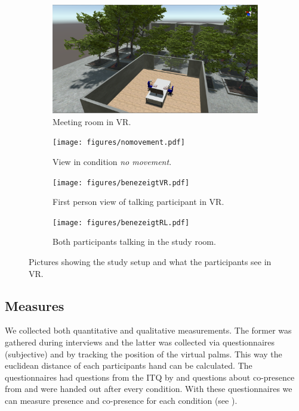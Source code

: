 \documentclass[english,runningheads,a4paper]{llncs}[2018/03/10]
\begin{document}
\begin{figure}[t]
    \centering
    \begin{subfigure}[b]{0.49\textwidth}
        \centering
        \includegraphics[width=\textwidth]{figures/far.pdf}
        \caption{Meeting room in VR.}
        \label{fig:meetingroom}
    \end{subfigure} \hfill
    \begin{subfigure}[b]{0.49\textwidth}
        \centering
        \texttt{[image: figures/nomovement.pdf]}
        \caption{View in condition \textit{no movement}.}
        \label{fig:meetingroom2}
    \end{subfigure} \hfill
    \begin{subfigure}[b]{0.49\textwidth}
        \centering
        \texttt{[image: figures/benezeigtVR.pdf]}
        \caption{First person view of talking participant in VR.}
        \label{fig:pointRL}
    \end{subfigure} \hfill
    \begin{subfigure}[b]{0.49\textwidth}
        \centering
        \texttt{[image: figures/benezeigtRL.pdf]}
        \caption{Both participants talking in the study room. }
        \label{fig:pointVR}
    \end{subfigure}
    \caption{Pictures showing the study setup and what the participants see in VR.}
    \label{fig:studypics}
\end{figure}
\subsection{Measures}

We collected both quantitative and qualitative measurements.
The former was gathered during interviews and the latter was collected via questionnaires (subjective) and by tracking the position of the virtual palms.
This way the euclidean distance of each participants hand can be calculated. 
The questionnaires had questions from the ITQ by \citet{Witmer1998b} and questions about co-presence from \citet{poeschl2015measuring} and were handed out after every condition.
With these questionnaires we can measure presence and co-presence for each condition (see ). 
\end{document}

